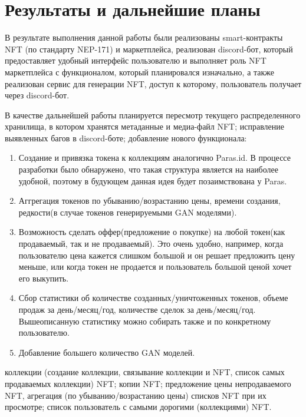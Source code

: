 \section{Результаты и дальнейшие планы}
\label{section.output}
В результате выполнения данной работы были реализованы smart-контракты NFT (по стандарту NEP-171) и маркетплейса, реализован discord-бот, который предоставляет удобный интерфейс пользователю и выполняет роль NFT маркетплейса с функционалом, который планировался изначально, а также реализован сервис для генерации NFT, доступ к которому, пользователь получает через discord-бот.

В качестве дальнейшей работы планируется пересмотр текущего распределенного хранилища, в котором хранятся метаданные и медиа-файл NFT; исправление выявленных багов в discord-боте; добавление нового функционала: 
\begin{enumerate}
    \item Создание и привязка токена к коллекциям аналогично Paras.id. В процессе разработки было обнаружено, что такая структура является на наиболее удобной, поэтому в будующем данная идея будет позаимствована у Paras. 
    \item Аггрегация токенов по убыванию/возрастанию цены, времени создания, редкости(в случае токенов генерируемыми GAN моделями).
    \item Возможность сделать оффер(предложение о покупке) на любой токен(как продаваемый, так и не продаваемый). Это очень удобно, например, когда пользователю цена кажется слишком большой и он решает предложить цену меньше, или когда токен не продается и пользователь большой ценой хочет его выкупить.
    \item Сбор статистики об количестве созданных/уничтоженных токенов, объеме продаж за день/месяц/год, количестве сделок за день/месяц/год. Вышеописанную статистику можно собирать также и по конкретному пользователю.
    \item Добавление большего количество GAN моделей.
\end{enumerate} коллекции (создание коллекции, связывание коллекции и NFT, список самых продаваемых коллекции) NFT; копии NFT; предложение цены непродаваемого NFT, агрегация (по убыванию/возрастанию цены) списков NFT при их просмотре; список пользователь с самыми дорогими (коллекциями) NFT.

\newpage

